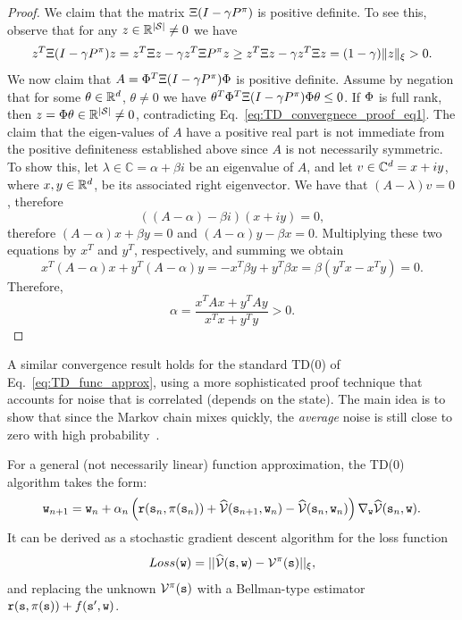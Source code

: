 \begin{enumerate}
\begin{proof}
We claim that the matrix $\Xi(I-\gamma P^\pi)$ is positive definite. To see this, observe that for any $z \in \mathbb{R}^{|\mathcal{S}|}\neq 0$ we have
\begin{equation}\label{eq:TD_convergnece_proof_eq1}
    z^T\Xi(I-\gamma P^\pi)z = z^T \Xi z - \gamma z^T \Xi P^\pi z \geq z^T \Xi z - \gamma z^T \Xi z = (1-\gamma) \|z\|_{\xi} > 0.
\end{equation}
We now claim that $A= \Phi^T \Xi(I-\gamma P^\pi) \Phi$ is positive definite. Assume by negation that for some $\theta \in \mathbb{R}^d$, $\theta\neq 0$ we have $\theta^T\Phi^T\Xi(I-\gamma P^\pi)\Phi\theta \leq 0$. If $\Phi$ is full rank, then $z = \Phi\theta \in \mathbb{R}^{|\mathcal{S}|} \neq 0$, contradicting Eq.~\eqref{eq:TD_convergnece_proof_eq1}. The claim that the eigen-values of $A$ have a positive real part is not immediate from the positive definiteness established above since $A$ is not necessarily symmetric. To show this, let $\lambda \in \mathbb{C} = \alpha + \beta i$ be an eigenvalue of $A$, and let $v \in \mathbb{C}^d = x + iy$, where $x,y\in \mathbb{R}^d$, be its associated right eigenvector. We have that $(A-\lambda)v = 0$, therefore
$$
((A - \alpha) -\beta i)(x + iy) = 0,
$$
therefore $(A-\alpha)x + \beta y = 0$ and $(A-\alpha)y - \beta x = 0$. Multiplying these two equations by $x^T$ and $y^T$, respectively, and summing we obtain
$$
x^T(A-\alpha)x + y^T(A-\alpha)y = - x^T\beta y + y^T\beta x = \beta(y^Tx - x^Ty) = 0.
$$
Therefore,
$$
\alpha = \frac{x^TAx + y^TAy}{x^Tx + y^Ty} > 0.
$$
\end{proof}

\begin{remark}
A similar convergence result holds for the standard TD(0) of Eq.~\ref{eq:TD_func_approx}, using a more sophisticated proof technique that accounts for noise that is correlated (depends on the state). The main idea is to show that since the Markov chain mixes quickly, the \textit{average} noise is still close to zero with high probability~\cite{TsitsiklisVR97}.
\end{remark}


\end{enumerate}
For a general (not necessarily linear) function approximation, the TD(0) algorithm takes the form:
\begin{equation*}
    {\tt w}_{n+1} = {\tt w}_n + \alpha_n \left( {\tt r}({\tt s}_n,\pi({\tt s}_n)) + \widehat{\mathcal{V}}({\tt s}_{n+1},{\tt w}_n) - \widehat{\mathcal{V}}({\tt s}_{n},{\tt w}_n) \right) \nabla_{{\tt w}} \widehat{\mathcal{V}}({\tt s}_n,{\tt w}).
\end{equation*}
It can be derived as a stochastic gradient descent algorithm for the loss function
\begin{equation*}
    Loss({\tt w}) = ||\widehat{\mathcal{V}}({\tt s},{\tt w}) - \mathcal{V}^\pi({\tt s})||_\xi,
\end{equation*}
and replacing the unknown $\mathcal{V}^\pi({\tt s})$ with a Bellman-type estimator ${\tt r}({\tt s},\pi({\tt s}))+f({\tt s}',{\tt w})$.
%

